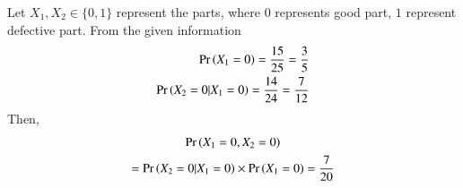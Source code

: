 %
Let $X_1,X_2\in\{0,1\}$ represent the parts, where $0$ represents good part, $1$ represent defective part. From the given information
\begin{align}
\Pr\left(X_1=0\right)=\frac{15}{25}=\frac{3}{5}\\
\Pr\left(X_2=0|X_1=0\right)=\frac{14}{24}=\frac{7}{12}
\end{align}
Then,
\begin{multline}
\Pr\left(X_1=0,X_2=0\right)\\
=\Pr\left(X_2=0|X_1=0\right)\times \Pr\left(X_1=0\right)=\frac{7}{20}
\end{multline}